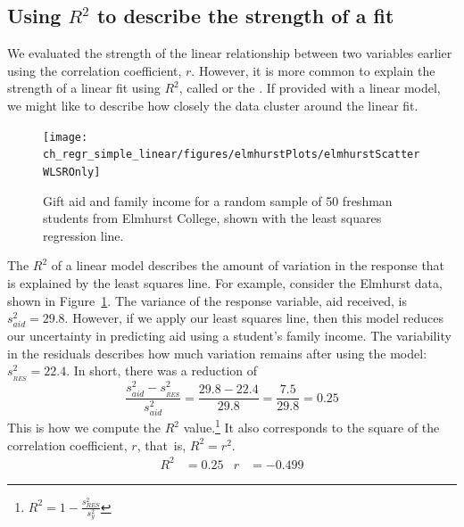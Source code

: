 
\subsection{Using $R^2$ to describe the strength of a fit}


We evaluated the strength of the linear relationship between two variables earlier using the correlation coefficient, $r$. However, it is more common to explain the strength of a linear fit using $R^2$, called  or the . If provided with a linear model, we might like to describe how closely the data cluster around the linear fit.


\begin{figure}
\centering
\texttt{[image: ch\_regr\_simple\_linear/figures/elmhurstPlots/elmhurstScatterWLSROnly]}
\caption{Gift aid and family income for a random sample of 50 freshman students from Elmhurst College, shown with the least squares regression line.}
\label{elmhurstScatterWLSROnly}
\end{figure}

The $R^2$ of a linear model describes the amount of variation in the response that is explained by the least squares line. For example, consider the Elmhurst data, shown in Figure~\ref{elmhurstScatterWLSROnly}. The variance of the response variable, aid received, is $s_{aid}^2=29.8$. However, if we apply our least squares line, then this model reduces our uncertainty in predicting aid using a student's family income. The variability in the residuals describes how much variation remains after using the model: $s_{_{RES}}^2 = 22.4$.  In short, there was a reduction of
$$\frac{s_{aid}^2 - s_{_{RES}}^2}{s_{aid}^2}
	= \frac{29.8 - 22.4}{29.8} = \frac{7.5}{29.8}
	= 0.25$$
This is how we compute the $R^2$ value.\footnote{$R^2=1-\frac{s^2_{RES}}{s^2_y}$} It also corresponds to the square of the correlation coefficient, $r$, that~is, $R^2=r^2$.
\begin{align*}
R^2 &= 0.25 & r &= -0.499
\end{align*}

